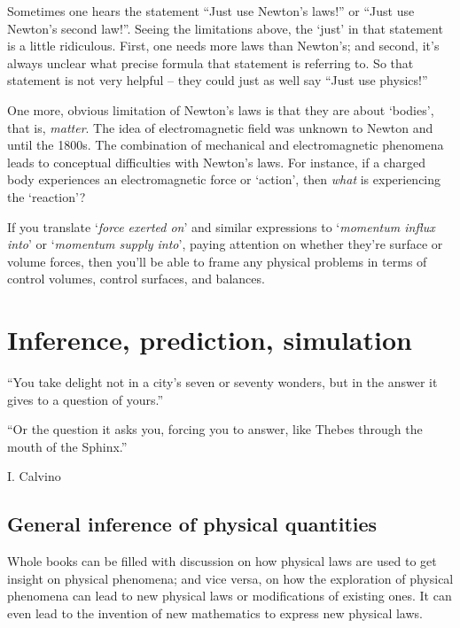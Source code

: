 \documentclass[a4paper,12pt,%
onecolumn,oneside,%
british%
]{memoir}
\newcommand{\mynotew}[1]{{\footnotesize\color{midgrey}\faIcon{tools}\ #1}}
\renewcommand*{\|}[1][]{\nonscript\:#1\vert\nonscript\:\mathopen{}}
\begin{document}
Sometimes one hears the statement \enquote{Just use Newton's laws!} or \enquote{Just use Newton's second law!}. Seeing the limitations above, the \enquote*{just} in that statement is a little ridiculous. First, one needs more laws than Newton's; and second, it's always unclear what precise formula that statement is referring to. So that statement is not very helpful -- they could just as well say \enquote{Just use physics!}

One more, obvious limitation of Newton's laws is that they are about \enquote*{bodies}, that is, \emph{matter}. The idea of electromagnetic field was unknown to Newton and until the 1800s. The combination of mechanical and electromagnetic phenomena leads to conceptual difficulties with Newton's laws. For instance, if a charged body experiences an electromagnetic force or \enquote*{action}, then \emph{what} is experiencing the \enquote*{reaction}?


\medskip

If you translate \enquote*{\emph{force exerted on\textellipsis}} and similar expressions to \enquote*{\emph{momentum influx into\textellipsis}} or \enquote*{\emph{momentum supply into\textellipsis}}, paying attention on whether they're surface or volume forces, then you'll be able to frame any physical problems in terms of control volumes, control surfaces, and balances.


\printpagenotes*
\cleartooddpage
\chapter{Inference, prediction, simulation}
\label{cha:inference}

\epigraph{ \enquote{\textellipsis You take delight not in a city's seven or seventy wonders, but in the answer it gives to a question of yours.}

\medskip

 \enquote{Or the question it asks you, forcing you to answer, like Thebes through the mouth of the Sphinx.}}{I. Calvino \cites*{calvino1972_t1979}}


\section{General inference of physical quantities}
\label{sec:general_inference}

Whole books can be filled with discussion on how physical laws are used to get insight on physical phenomena; and vice versa, on how the exploration of physical phenomena can lead to new physical laws or modifications of existing ones. It can even lead to the invention of new mathematics to express new physical laws.
\end{document}
